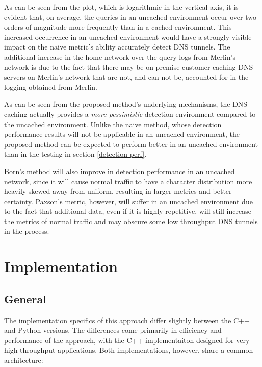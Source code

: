 \documentclass[12pt]{report}
\theoremstyle{remark}
\theoremstyle{definition}
\theoremstyle{definition}
\theoremstyle{definition}
\begin{document}
As can be seen from the plot, which is logarithmic in the vertical axis, it is
evident that, on average, the queries in an uncached environment occur over two
orders of magnitude more frequently than in a cached environment. This increased
occurrence in an uncached environment would have a strongly visible impact on
the naive metric's ability accurately detect DNS tunnels. The additional
increase in the home network over the query logs from Merlin's network is due to
the fact that there may be on-premise customer caching DNS servers on Merlin's
network that are not, and can not be, accounted for in the logging obtained from
Merlin.

As can be seen from the proposed method's underlying mechanisms, the DNS caching
actually provides a \emph{more pessimistic} detection environment compared to
the uncached environment. Unlike the naive method, whose detection performance
results will not be applicable in an uncached environment, the proposed method
can be expected to perform better in an uncached environment than in the
testing in section \ref{detection-perf}.

Born's method will also improve in detection performance in an uncached network,
since it will cause normal traffic to have a character distribution more heavily
skewed away from uniform, resulting in larger metrics and better certainty.
Paxson's metric, however, will suffer in an uncached environment due to the fact
that additional data, even if it is highly repetitive, will still increase the
metrics of normal traffic and may obscure some low throughput DNS tunnels in the 
process.

\section{Implementation}
\label{implementation}
\subsection{General}

The implementation specifics of this approach differ slightly between the C++
and Python versions. The differences come primarily in efficiency and
performance of the approach, with the C++ implementaiton designed for very high
throughput applications. Both implementations, however, share a common
architecture:
\end{document}
